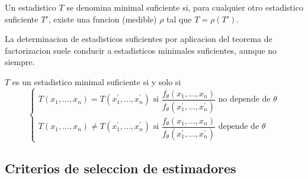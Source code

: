 \documentclass[10pt]{extarticle}
\newcommand{\<}{\langle}
\renewcommand{\>}{\rangle}
\theoremstyle{definition}
\begin{document}
\begin{itemize}
        Un estadistico $T$ se denomina minimal suficiente si, para cualquier otro estadistico suficiente $T'$, existe una funcion (medible) $\rho$ tal que $T=\rho(T')$.

        La determinacion de estadisticos suficientes por aplicacion del teorema de factorizacion suele conducir a estadisticos minimales suficientes, aunque no siempre.

        $T$ es un estadistico minimal suficiente si y solo si
        \begin{equation*}
          \begin{cases}
            T(x_1,...,x_n)=T(x_1^{'},...,x_n^{'}) \text{ si } \dfrac{f_\theta(x_1,...,x_n)}{f_\theta (x_1^{'},...,x_n^{'})} \text{ no depende de } \theta \\
            T(x_1,...,x_n) \neq T(x_1^{'},...,x_n^{'}) \text{ si } \dfrac{f_\theta(x_1,...,x_n)}{f_\theta (x_1^{'},...,x_n^{'})} \text{ depende de } \theta
          \end{cases}
        \end{equation*}
\end{itemize}

\subsection*{Criterios de seleccion de estimadores}
\end{document}
